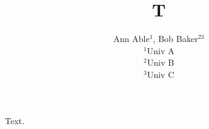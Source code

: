 \documentclass{article}
\begin{document}
\title{T}\author{Ann Able$^{1}$, Bob Baker$^{23}$\\ $^1$Univ A\\ $^2$Univ B\\ $^3$Univ C}
\maketitle
Text.
\end{document}
